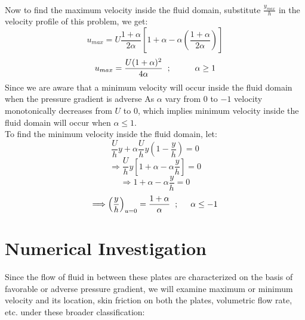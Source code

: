 \documentclass[14pt,one side, a4paper]{extbook}
\begin{document}
	 	\\Now to find the maximum velocity inside the fluid domain, substitute $\frac{y_{max}}{h}$ in the velocity profile of this problem, we get:
	 	\begin{equation}
	 		u_{max}=U\frac{1+\alpha}{2\alpha}\left[1+\alpha-\alpha\left(\frac{1+\alpha}{2\alpha}\right)\right]
	 	\end{equation} 
	 	$$u_{max}=\frac{U(1+\alpha)^{2}}{4\alpha} \hspace{0.2cm};\hspace{1cm} \alpha\geq1$$
	 	Since we are aware that a minimum velocity will occur inside the fluid domain when the pressure gradient is adverse 
	 	As $\alpha$ vary from $0$ to $-1$ velocity monotonically decreases from $U$ to $0$, which implies minimum velocity inside the fluid domain will occur when $\alpha\leq1$.
	 	\\To find the minimum velocity inside the fluid domain, let:
	 	\begin{equation}
	 		\frac{U}{h}y+\alpha\frac{U}{h}y\left(1-\frac{y}{h}\right)=0
	 	\end{equation}
	 	$$\Longrightarrow \frac{U}{h}y\left[1+\alpha-\alpha\frac{y}{h}\right]=0$$
	 	$$\Longrightarrow 1+\alpha-\alpha\frac{y}{h}=0$$
	 	$$\Longrightarrow \left(\frac{y}{h}\right)_{u=0}=\frac{1+\alpha}{\alpha}\hspace{0.2cm}; \hspace{0.5cm}\alpha\leq-1$$ 
	 	
	 	
	 	\section{Numerical Investigation}
	 	Since the flow of fluid in between these plates are characterized on the basis of favorable or adverse pressure gradient, we will examine maximum or minimum velocity and its location, skin friction on both the plates, volumetric flow rate, etc. under these broader classification:
\end{document}
